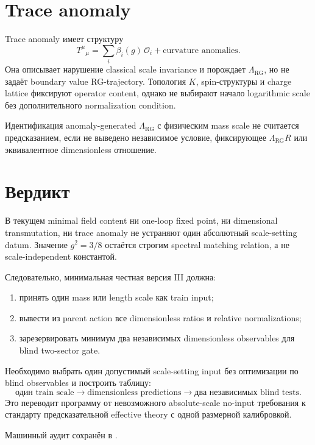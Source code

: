 \section{Trace anomaly}

Trace anomaly имеет структуру
\begin{equation}
 T^\mu{}_\mu
 =
 \sum_i\beta_i(g)\,\mathcal O_i
 +\text{curvature anomalies}.
\end{equation}
Она описывает нарушение classical scale invariance и порождает
\(\Lambda_{\mathrm{RG}}\), но не задаёт boundary value RG-trajectory.
Топология \(K\), spin-структуры и charge lattice фиксируют operator
content, однако не выбирают начало logarithmic scale без дополнительного
normalization condition.

\begin{nogocriterion}
Идентификация anomaly-generated \(\Lambda_{\mathrm{RG}}\) с физическим
mass scale не считается предсказанием, если не выведено независимое
условие, фиксирующее \(\Lambda_{\mathrm{RG}}R\) или эквивалентное
dimensionless отношение.
\end{nogocriterion}

\section{Вердикт}

\begin{theorem}
В текущем minimal field content ни one-loop fixed point, ни dimensional
transmutation, ни trace anomaly не устраняют один абсолютный scale-setting
datum. Значение \(g^2=3/8\) остаётся строгим spectral matching relation,
а не scale-independent константой.
\end{theorem}

Следовательно, минимальная честная версия III должна:
\begin{enumerate}
 \item принять один mass или length scale как train input;
 \item вывести из parent action все dimensionless ratios и relative
 normalizations;
 \item зарезервировать минимум два независимых dimensionless observables
 для blind two-sector gate.
\end{enumerate}

\begin{protocol}
Необходимо выбрать один допустимый scale-setting input без оптимизации
по blind observables и построить таблицу:
\begin{equation}
 \text{один train scale}
 \longrightarrow
 \text{dimensionless predictions}
 \longrightarrow
 \text{два независимых blind tests}.
\end{equation}
Это переводит программу от невозможного absolute-scale no-input требования
к стандарту предсказательной effective theory с одной размерной
калибровкой.
\end{protocol}

Машинный аудит сохранён в
.